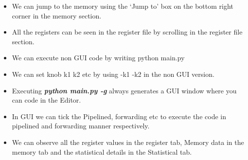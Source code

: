 \documentclass{article}
\begin{document}
\begin{itemize}
    \item We can jump to the memory using the `Jump to' box on the bottom right corner in the memory section.
    \item All the registers can be seen in the register file by scrolling in the register file section.
    \item We can execute non GUI code by writing \textrightarrow   python main.py
    \item We can set knob k1 k2 etc by using -k1 -k2 in the non GUI version.
    \item Executing \textsl{\textbf{python main.py -g}} always generates a GUI window where you can code in the Editor.
    \item In GUI we can tick the Pipelined, forwarding etc to execute the code in pipelined and forwarding manner respectively.
    \item We can observe all the register values in the register tab, Memory data in the memory tab and the statistical details in the Statistical tab.
\end{itemize}
\end{document}

